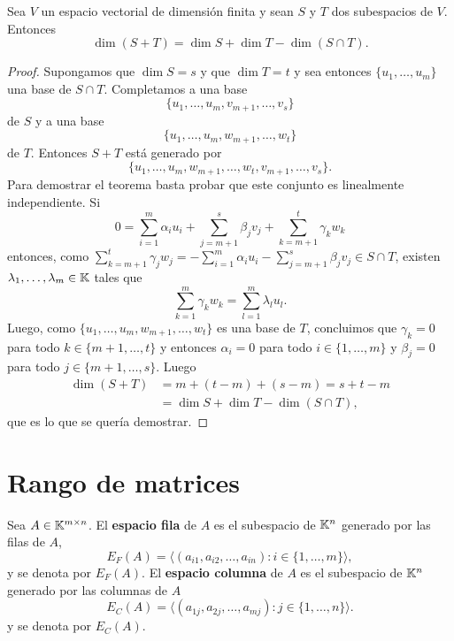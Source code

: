 \begin{thm}
	\label{thm:de_la_dimension}
	Sea $V$ un espacio vectorial de dimensión finita y sean $S$ y $T$ dos
	subespacios de $V$. Entonces
	\[
		\dim(S+T)=\dim S+\dim T-\dim(S\cap T).
	\]

	\begin{proof}
		Supongamos que $\dim S=s$ y que $\dim T=t$ y sea entonces $\{u_1,\dots,u_m\}$ una
		base de $S\cap T$. Completamos a una base
		\[
            \{u_1,\dots,u_m,v_{m+1},\dots,v_s\}
        \]
        de $S$ y a una base
		\[
            \{u_1,\dots,u_m,w_{m+1},\dots,w_t\}
        \]
        de $T$. Entonces $S+T$ está
		generado por \[
            \{u_1,\dots,u_m,w_{m+1},\dots,w_t,v_{m+1},\dots,v_s\}.
        \]
		Para demostrar el teorema basta probar que este conjunto es linealmente
		independiente. Si 
		\[
			0=\sum_{i=1}^m \alpha_i u_i + \sum_{j=m+1}^s \beta_jv_j + \sum_{k=m+1}^t\gamma_kw_k
		\]
		entonces, como $\sum_{k=m+1}^t\gamma_jw_j=-\sum_{i=1}^m \alpha_i u_i -
		\sum_{j=m+1}^s \beta_jv_j\in S\cap T$, existen $\lambda_1,\dots,\lambda_m\in\mathbb{K}$ tales que 
		\[
		\sum_{k=1}^m \gamma_k w_k=\sum_{l=1}^m \lambda_l u_l.
		\]
		Luego, como $\{u_1,\dots,u_m,w_{m+1},\dots,w_t\}$ es
		una base de $T$, concluimos que $\gamma_k=0$ para todo
		$k\in\{m+1,\dots,t\}$ y entonces $\alpha_i=0$  para todo
		$i\in\{1,\dots,m\}$ y $\beta_j=0$ para todo $j\in\{m+1,\dots,s\}$. Luego
        \begin{align*}
			\dim(S+T)&=m+(t-m)+(s-m)=s+t-m\\
            &=\dim S+\dim T-\dim(S\cap T),
        \end{align*}
		que es lo que se quería demostrar.
	\end{proof}
\end{thm}


\section{Rango de matrices}

\begin{block}
	Sea $A\in\mathbb{K}^{m\times n}$. El \textbf{espacio fila} de $A$ es el subespacio
	de $\mathbb{K}^n$ generado por las filas de $A$,
	\[
		E_F(A)=\langle (a_{i1},a_{i2},\dots,a_{in}):i\in\{1,\dots,m\}\rangle,
	\]
	y se denota por $E_F(A)$. El \textbf{espacio columna} de $A$ es el subespacio
	de $\mathbb{K}^n$ generado por las columnas de $A$ 
	\[
		E_C(A)=\langle (a_{1j},a_{2j},\dots,a_{mj}):j\in\{1,\dots,n\}\rangle.
	\]
	y se denota por $E_C(A)$. 
\end{block}

